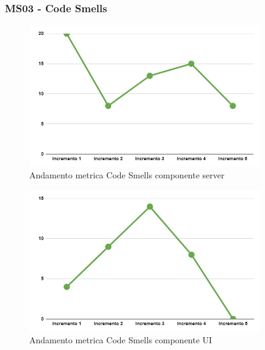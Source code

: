 \subsubsection{MS03 - Code Smells}
\begin{figure}[H]
	\centering
	\includegraphics[width=10cm]{images/metricheServer/code_smells.png}
	\caption{Andamento metrica Code Smells componente server}
\end{figure}
\begin{figure}[H]
	\centering
	\includegraphics[width=10cm]{images/metricheUI/code_smells.png}
	\caption{Andamento metrica Code Smells componente UI}
\end{figure}


